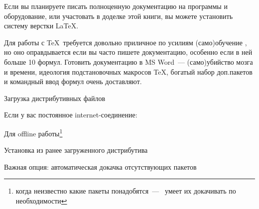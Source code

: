 \label{texinstall}

Если вы планируете писать полноценную документацию на программы
и оборудование, или участовать в доделке этой книги, вы можете установить
систему верстки \LaTeX.

Для работы с \TeX\ требуется довольно приличное по усилиям
(само)обучение \cite{lugovsky}, но оно оправдывается если вы часто 
пишете документацию, особенно если в ней больше 10 формул.
Готовить документацию в MS Word\ --- (само)убийство мозга и времени,
идеология подстановочных макросов \TeX, богатый набор доп.пакетов
и командный ввод формул очень доставляют.


\bigskip{}


\bigskip Загрузка дистрибутивных файлов



Если у вас постоянное internet-соединение: 

Для offline работы\footnote{когда неизвестно какие пакеты понадобятся\ ---
\miktex\ умеет их докачивать по необходимости} 



\bigskip Установка из ранее загруженного дистрибутива








Важная опция: автоматическая докачка отсутствующих пакетов

